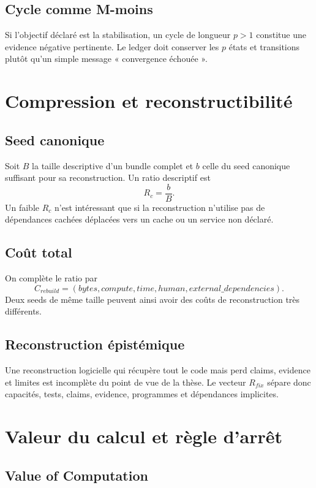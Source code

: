 \section{Cycle comme M-moins}

Si l'objectif déclaré est la stabilisation, un cycle de longueur $p>1$ constitue une evidence négative pertinente. Le ledger doit conserver les $p$ états et transitions plutôt qu'un simple message « convergence échouée ».

\chapter{Compression et reconstructibilité}

\section{Seed canonique}

Soit $B$ la taille descriptive d'un bundle complet et $b$ celle du seed canonique suffisant pour sa reconstruction. Un ratio descriptif est
\[
R_c=\frac{b}{B}.
\]
Un faible $R_c$ n'est intéressant que si la reconstruction n'utilise pas de dépendances cachées déplacées vers un cache ou un service non déclaré.

\section{Coût total}

On complète le ratio par
\[
C_{rebuild}=(bytes,compute,time,human,external\_dependencies).
\]
Deux seeds de même taille peuvent ainsi avoir des coûts de reconstruction très différents.

\section{Reconstruction épistémique}

Une reconstruction logicielle qui récupère tout le code mais perd claims, evidence et limites est incomplète du point de vue de la thèse. Le vecteur $R_{fix}$ sépare donc capacités, tests, claims, evidence, programmes et dépendances implicites.

\chapter{Valeur du calcul et règle d'arrêt}

\section{Value of Computation}

